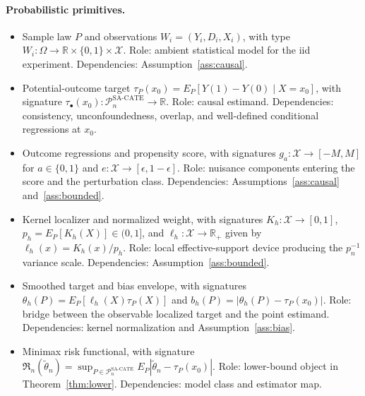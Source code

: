\documentclass[11pt]{article}
\theoremstyle{definition}
\theoremstyle{plain}
\theoremstyle{remark}
\begin{document}
\paragraph{Probabilistic primitives.}
\begin{itemize}[leftmargin=*]
  \item Sample law $P$ and observations $W_i=(Y_i,D_i,X_i)$, with type $W_i:\Omega\to\mathbb{R}\times\{0,1\}\times\mathcal{X}$. Role: ambient statistical model for the iid experiment. Dependencies: Assumption~\ref{ass:causal}.
  \item Potential-outcome target $\tau_P(x_0)=E_P[Y(1)-Y(0)\mid X=x_0]$, with signature $\tau_{\bullet}(x_0):\mathcal{P}_n^{\mathrm{SA\text{-}CATE}}\to\mathbb{R}$. Role: causal estimand. Dependencies: consistency, unconfoundedness, overlap, and well-defined conditional regressions at $x_0$.
  \item Outcome regressions and propensity score, with signatures $g_a:\mathcal{X}\to[-M,M]$ for $a\in\{0,1\}$ and $e:\mathcal{X}\to[\epsilon,1-\epsilon]$. Role: nuisance components entering the score and the perturbation class. Dependencies: Assumptions~\ref{ass:causal} and~\ref{ass:bounded}.
  \item Kernel localizer and normalized weight, with signatures $K_h:\mathcal{X}\to[0,1]$, $p_h=E_P[K_h(X)]\in(0,1]$, and $\ell_h:\mathcal{X}\to\mathbb{R}_+$ given by $\ell_h(x)=K_h(x)/p_h$. Role: local effective-support device producing the $p_n^{-1}$ variance scale. Dependencies: Assumption~\ref{ass:bounded}.
  \item Smoothed target and bias envelope, with signatures $\theta_h(P)=E_P[\ell_h(X)\tau_P(X)]$ and $b_h(P)=|\theta_h(P)-\tau_P(x_0)|$. Role: bridge between the observable localized target and the point estimand. Dependencies: kernel normalization and Assumption~\ref{ass:bias}.
  \item Minimax risk functional, with signature $\mathfrak R_n(\tilde\theta_n)=\sup_{P\in\mathcal{P}_n^{\mathrm{SA\text{-}CATE}}}E_P|\tilde\theta_n-\tau_P(x_0)|$. Role: lower-bound object in Theorem~\ref{thm:lower}. Dependencies: model class and estimator map.
\end{itemize}
\end{document}
